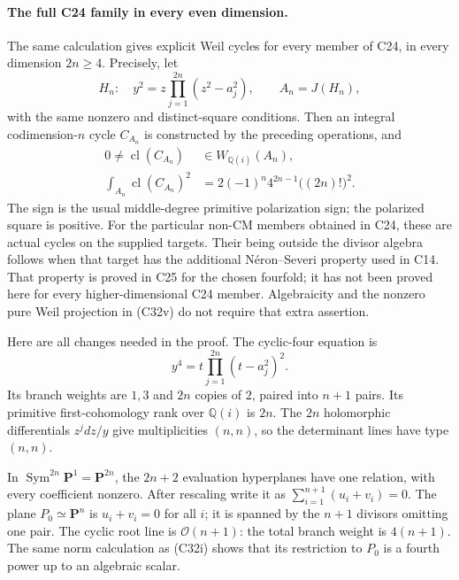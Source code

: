 \documentclass[11pt]{article}
\newcommand{\Q}{\mathbb Q}\newcommand{\C}{\mathbb C}\newcommand{\Z}{\mathbb Z}\newcommand{\R}{\mathbb R}\newcommand{\A}{\mathbb A}\newcommand{\OO}{\mathcal O}
\theoremstyle{definition}\newtheorem{definition}[theorem]{Definition}\newtheorem{remark}[theorem]{Remark}
\begin{document}
\paragraph{The full C24 family in every even dimension.}
The same calculation gives explicit Weil cycles for
every member of C24, in every dimension $2n\geq4$.
Precisely, let
\[
 H_n:\quad y^2=z\prod_{j=1}^{2n}(z^2-a_j^2),
 \qquad A_n=J(H_n),
                                                        \tag{C32u}
\]
with the same nonzero and distinct-square conditions.
Then an integral codimension-$n$ cycle $C_{A_n}$
is constructed by the preceding operations, and
\[
 \begin{split}
 0\ne\operatorname{cl}(C_{A_n})&\in W_{\Q(i)}(A_n),\\
 \int_{A_n}\operatorname{cl}(C_{A_n})^2
       &=2(-1)^n4^{2n-1}\bigl((2n)!\bigr)^2.
 \end{split}
                                                        \tag{C32v}
\]
The sign is the usual middle-degree primitive
polarization sign; the polarized square is positive.
For the particular non-CM members obtained in C24,
these are actual cycles on the supplied targets.
Their being outside the divisor algebra follows
when that target has the additional N\'eron--Severi
property used in C14.  That property is proved in
C25 for the chosen fourfold; it has not been
proved here for every higher-dimensional C24
member.  Algebraicity and the nonzero pure Weil
projection in (C32v) do not require that extra
assertion.

Here are all changes needed in the proof.  The
cyclic-four equation is
\[
            y^4=t\prod_{j=1}^{2n}(t-a_j^2)^2.
\]
Its branch weights are $1,3$ and $2n$ copies of
$2$, paired into $n+1$ pairs.  Its primitive
first-cohomology rank over $\Q(i)$ is $2n$.
The $2n$ holomorphic differentials $z^jdz/y$
give multiplicities $(n,n)$, so the determinant
lines have type $(n,n)$.

In $\operatorname{Sym}^{2n}\mathbf P^1
=\mathbf P^{2n}$, the $2n+2$ evaluation
hyperplanes have one relation, with every
coefficient nonzero.  After rescaling write
it as $\sum_{i=1}^{n+1}(u_i+v_i)=0$.
The plane $P_0\simeq\mathbf P^n$ is
$u_i+v_i=0$ for all $i$; it is spanned by
the $n+1$ divisors omitting one pair.  The
cyclic root line is $\mathcal O(n+1)$:
the total branch weight is $4(n+1)$.
The same norm calculation as (C32i) shows
that its restriction to $P_0$ is a fourth
power up to an algebraic scalar.
\end{document}
